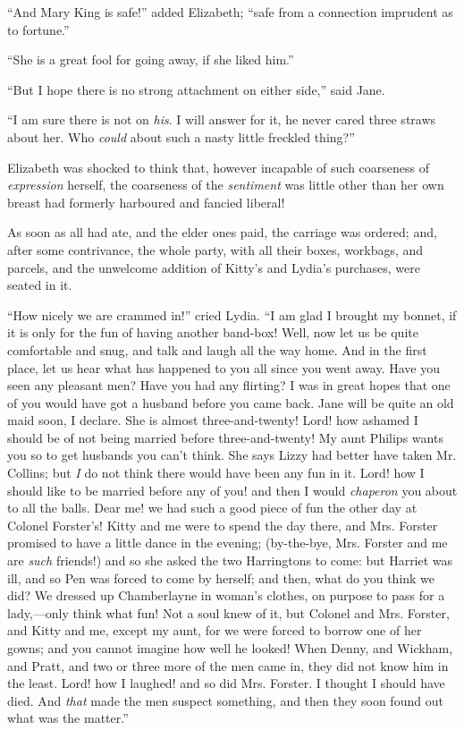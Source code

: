 \documentclass[12pt,openright]{book}
\begin{document}
“And Mary King is safe!” added Elizabeth; “safe from a connection imprudent as to fortune.”

“She is a great fool for going away, if she liked him.”

“But I hope there is no strong attachment on either side,” said Jane.

“I am sure there is not on \textit{his}. I will answer for it, he never cared three straws about her. Who \textit{could} about such a nasty little freckled thing?”

Elizabeth was shocked to think that, however incapable of such coarseness of \textit{expression} herself, the coarseness of the \textit{sentiment} was little other than her own breast had formerly harboured and fancied liberal!

As soon as all had ate, and the elder ones paid, the carriage was ordered; and, after some contrivance, the whole party, with all their boxes, workbags, and parcels, and the unwelcome addition of Kitty’s and Lydia’s purchases, were seated in it.

“How nicely we are crammed in!” cried Lydia. “I am glad I brought my bonnet, if it is only for the fun of having another band-box! Well, now let us be quite comfortable and snug, and talk and laugh all the way home. And in the first place, let us hear what has happened to you all since you went away. Have you seen any pleasant men? Have you had any flirting? I was in great hopes that one of you would have got a husband before you came back. Jane will be quite an old maid soon, I declare. She is almost three-and-twenty! Lord! how ashamed I should be of not being married before three-and-twenty! My aunt Philips wants you so to get husbands you can’t think. She says Lizzy had better have taken Mr. Collins; but \textit{I} do not think there would have been any fun in it. Lord! how I should like to be married before any of you! and then I would \textit{chaperon} you about to all the balls. Dear me! we had such a good piece of fun the other day at Colonel Forster’s! Kitty and me were to spend the day there, and Mrs. Forster promised to have a little dance in the evening; (by-the-bye, Mrs. Forster and me are \textit{such} friends!) and so she asked the two Harringtons to come: but Harriet was ill, and so Pen was forced to come by herself; and then, what do you think we did? We dressed up Chamberlayne in woman’s clothes, on purpose to pass for a lady,—only think what fun! Not a soul knew of it, but Colonel and Mrs. Forster, and Kitty and me, except my aunt, for we were forced to borrow one of her gowns; and you cannot imagine how well he looked! When Denny, and Wickham, and Pratt, and two or three more of the men came in, they did not know him in the least. Lord! how I laughed! and so did Mrs. Forster. I thought I should have died. And \textit{that} made the men suspect something, and then they soon found out what was the matter.”
\end{document}
